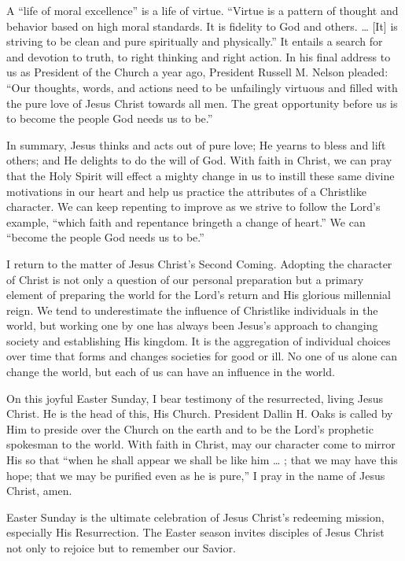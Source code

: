 \documentclass[letterpaper, 11pt]{report}
\newcommand{\speaker}{}
\newcommand{\talk}{}
\newcommand{\talkdatestr}{}
\newcommand{\setspeaker}[1]{\renewcommand{\speaker}{#1}}
\newcommand{\settalk}[1]{\renewcommand{\talk}{#1}}
\newcommand{\talkheading}[2]{%
    \vspace{1em}
    \noindent{\huge\bfseries #1}
    \par\nopagebreak\vspace{0.25em}
    \noindent{\normalsize\bfseries #2\ifx\talkdatestr\empty\else,\ \talkdatestr\fi}
    \par\nopagebreak\vspace{0.5em}
}
\begin{document}
A “life of moral excellence” is a life of virtue. “Virtue is a pattern of thought and behavior based on high moral standards. It is fidelity to God and others. … [It] is striving to be clean and pure spiritually and physically.” It entails a search for and devotion to truth, to right thinking and right action. In his final address to us as President of the Church a year ago, President Russell M. Nelson pleaded: “Our thoughts, words, and actions need to be unfailingly virtuous and filled with the pure love of Jesus Christ towards all men. The great opportunity before us is to become the people God needs us to be.”

In summary, Jesus thinks and acts out of pure love; He yearns to bless and lift others; and He delights to do the will of God. With faith in Christ, we can pray that the Holy Spirit will effect a mighty change in us to instill these same divine motivations in our heart and help us practice the attributes of a Christlike character. We can keep repenting to improve as we strive to follow the Lord’s example, “which faith and repentance bringeth a change of heart.” We can “become the people God needs us to be.”

I return to the matter of Jesus Christ’s Second Coming. Adopting the character of Christ is not only a question of our personal preparation but a primary element of preparing the world for the Lord’s return and His glorious millennial reign. We tend to underestimate the influence of Christlike individuals in the world, but working one by one has always been Jesus’s approach to changing society and establishing His kingdom. It is the aggregation of individual choices over time that forms and changes societies for good or ill. No one of us alone can change the world, but each of us can have an influence in the world.

On this joyful Easter Sunday, I bear testimony of the resurrected, living Jesus Christ. He is the head of this, His Church. President Dallin H. Oaks is called by Him to preside over the Church on the earth and to be the Lord’s prophetic spokesman to the world. With faith in Christ, may our character come to mirror His so that “when he shall appear we shall be like him … ; that we may have this hope; that we may be purified even as he is pure,” I pray in the name of Jesus Christ, amen.

\newpage
\settalk{Remember, Remember}
\setspeaker{Chi Hong (Sam) Wong}
\talkheading{Remember, Remember}{Chi Hong (Sam) Wong}

Easter Sunday is the ultimate celebration of Jesus Christ’s redeeming mission, especially His Resurrection. The Easter season invites disciples of Jesus Christ not only to rejoice but to remember our Savior.
\end{document}

